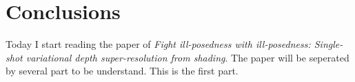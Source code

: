 \documentclass[10pt,twocolumn,letterpaper]{article}
\begin{document}
\section{Conclusions}
Today I start reading the paper of \emph{Fight ill-posedness with ill-posedness: Single-shot variational depth super-resolution from shading}. The paper will be seperated by several part to be understand. This is the first part.

{\small


}
\end{document}
